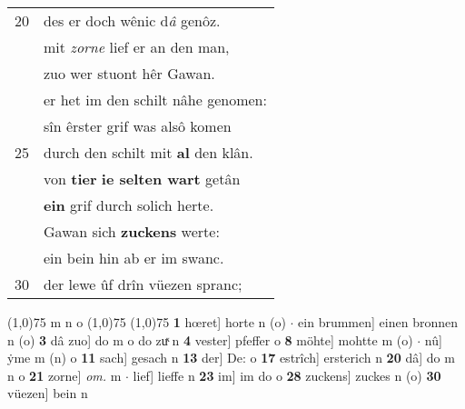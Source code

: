 \documentclass[8pt,a4paper,notitlepage]{article}
\begin{document}
\begin{table}[ht]
\begin{minipage}[t]{0.5\linewidth}
\begin{tabular}{rl}
20 & des er doch wênic d\textit{â} genôz.\\ 
 & mit \textit{zorne} lief er an den man,\\ 
 & zuo wer stuont hêr Gawan.\\ 
 & er het im den schilt nâhe genomen:\\ 
 & sîn êrster grif was alsô komen\\ 
25 & durch den schilt mit \textbf{al} den klân.\\ 
 & von \textbf{tier} \textbf{ie selten wart} getân\\ 
 & \textbf{ein} grif durch solich herte.\\ 
 & Gawan sich \textbf{zuckens} werte:\\ 
 & ein bein hin ab er im swanc.\\ 
30 & der lewe ûf drîn vüezen spranc;\\ 
\end{tabular}
\scriptsize
\line(1,0){75} \newline
m n o \newline
\line(1,0){75} \newline
\newline
\line(1,0){75} \newline
\textbf{1} hœret] horte n (o)  $\cdot$ ein brummen] einen bronnen n (o) \textbf{3} dâ zuo] do m o do zuͯ n \textbf{4} vester] pfeffer o \textbf{8} möhte] mohtte m (o)  $\cdot$ nû] ẏme m (n) o \textbf{11} sach] gesach n \textbf{13} der] De: o \textbf{17} estrîch] ersterich n \textbf{20} dâ] do m n o \textbf{21} zorne] \textit{om.} m  $\cdot$ lief] lieffe n \textbf{23} im] im do o \textbf{28} zuckens] zuckes n (o) \textbf{30} vüezen] bein n \newline
\end{minipage}
\end{table}
\newpage
\end{document}
